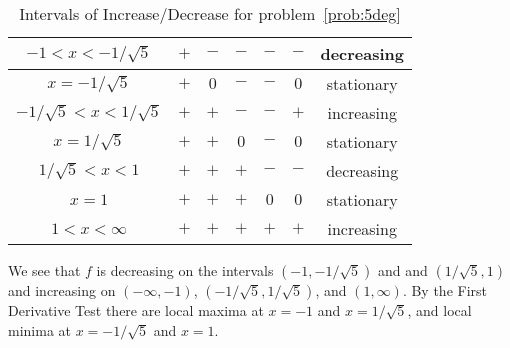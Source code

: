 \documentclass{article}
\begin{document}
\begin{enumerate}
\begin{enumerate}
\begin{table}[htbp]
\begin{tabular}{|c|c|c|c|c|c|c|}
        \\
        \hline
        $-1<x<-1/\sqrt{5}$         & $+$   & $-$            & $-$            & $-$   & $-$     & decreasing
        \\
        \hline
        $x=-1/\sqrt{5}$            & $+$   & $0$            & $-$            & $-$   & $0$     & stationary
        \\
        \hline
        $-1/\sqrt{5}<x<1/\sqrt{5}$ & $+$   & $+$            & $-$            & $-$   & $+$     & increasing
        \\
        \hline
        $x=1/\sqrt{5}$             & $+$   & $+$            & $0$            & $-$   & $0$     & stationary
        \\
        \hline
        $1/\sqrt{5}<x<1$           & $+$   & $+$            & $+$            & $-$   & $-$     & decreasing
        \\
        \hline
        $x=1$                      & $+$   & $+$            & $+$            & $0$   & $0$     & stationary
        \\
        \hline
        $1<x<\infty$               & $+$   & $+$            & $+$            & $+$   & $+$     & increasing
        \\
        \hline
      \end{tabular}
      \caption{Intervals of Increase/Decrease for problem~\ref{prob:5deg}}
      \label{tab:5degfp}
    \end{table}
    We see that $f$ is decreasing on the intervals $(-1,-1/\sqrt{5})$
    and and $(1/\sqrt{5},1)$ and increasing on $(-\infty,-1)$,
    $(-1/\sqrt{5},1/\sqrt{5})$, and $(1,\infty)$.  By the First
    Derivative Test there are local maxima at $x=-1$ and
    $x=1/\sqrt{5}$, and local minima at $x=-1/\sqrt{5}$ and $x=1$.


\end{enumerate}
\end{enumerate}
\end{document}
